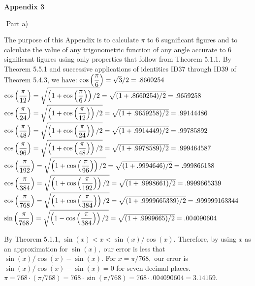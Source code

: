 \newpage
\lhead{}
\begin{center}
\textbf{Appendix 3}
\end{center}
$ $\nl
Part a)\nl

The purpose of this Appendix is to calculate $\pi$ to 6 sugnificant figures and to calculate the value of any trigonometric function of any angle accurate to 6 significant figures using only properties that follow from Theorem 5.1.1.  By Theorem 5.5.1 and successive applications of identities ID37 through ID39 of Theorem 5.4.3, we have:\nl
$\cos \left(\dfrac{\pi}{6}\right) = \sqrt{3}/2 = .8660254$\nl
$\cos\left(\dfrac{\pi}{12}\right) = \sqrt{\left(1 + \cos\left(\dfrac{\pi}{6}\right)\right)/2} = \sqrt{(1 + .8660254)/2} = .9659258$\nl
$\cos\left(\dfrac{\pi}{24}\right) = \sqrt{\left(1 + \cos\left(\dfrac{\pi}{12}\right)\right)/2} = \sqrt{(1 + .9659258)/2} = .99144486$\nl
$\cos\left(\dfrac{\pi}{48}\right) = \sqrt{\left(1 + \cos\left(\dfrac{\pi}{24}\right)\right)/2} = \sqrt{(1 + .9914449)/2} = .99785892$\nl
$\cos\left(\dfrac{\pi}{96}\right) = \sqrt{\left(1 + \cos\left(\dfrac{\pi}{48}\right)\right)/2} = \sqrt{(1 + .9978589)/2} = .999464587$\nl
$\cos\left(\dfrac{\pi}{192}\right) = \sqrt{\left(1 + \cos\left(\dfrac{\pi}{96}\right)\right)/2} = \sqrt{(1 + .9994646)/2} = .999866138$\nl
$\cos\left(\dfrac{\pi}{384}\right) = \sqrt{\left(1 + \cos\left(\dfrac{\pi}{192}\right)\right)/2} = \sqrt{(1 + .9998661)/2} = .9999665339$\nl
$\cos\left(\dfrac{\pi}{768}\right) = \sqrt{\left(1 + \cos\left(\dfrac{\pi}{384}\right)\right)/2} = \sqrt{(1 + .9999665339)/2} = .999999163344$\nl
$\sin\left(\dfrac{\pi}{768}\right) = \sqrt{\left(1 - \cos\left(\dfrac{\pi}{384}\right)\right)/2} = \sqrt{(1 + .9999665)/2} = .004090604$\nl

By Theorem 5.1.1, $\sin(x) < x < \sin(x)/\cos(x).$  Therefore, by using $x$ as an approximation for $\sin(x),$ our error is less that $\sin(x)/\cos(x) - \sin(x).$   For $x = \pi/768,$ our error is $\sin(x)/\cos(x) - \sin(x) = 0$ for seven decimal places.\nl
$\pi = 768\cdot(\pi/768) = 768\cdot\sin(\pi/768) = 768\cdot .004090604 = 3.14159.$\nl


